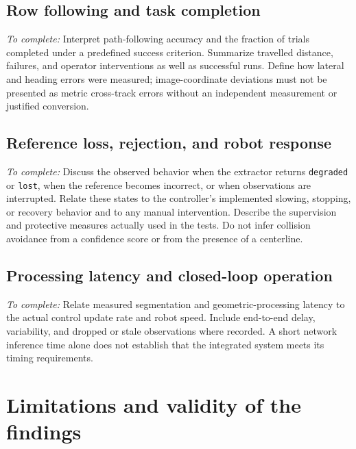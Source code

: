 \subsection{Row following and task completion}
\label{subsec:c6_field_tracking}

\emph{To complete:} Interpret path-following accuracy and the fraction
of trials completed under a predefined success criterion. Summarize
travelled distance, failures, and operator interventions as well as
successful runs. Define how lateral and heading errors were measured;
image-coordinate deviations must not be presented as metric cross-track
errors without an independent measurement or justified conversion.

\subsection{Reference loss, rejection, and robot response}
\label{subsec:c6_field_failures}

\emph{To complete:} Discuss the observed behavior when the extractor
returns \texttt{degraded} or \texttt{lost}, when the reference becomes
incorrect, or when observations are interrupted. Relate these states to
the controller's implemented slowing, stopping, or recovery behavior and
to any manual intervention. Describe the supervision and protective
measures actually used in the tests. Do not infer collision avoidance
from a confidence score or from the presence of a centerline.

\subsection{Processing latency and closed-loop operation}
\label{subsec:c6_field_timing}

\emph{To complete:} Relate measured segmentation and geometric-processing
latency to the actual control update rate and robot speed. Include
end-to-end delay, variability, and dropped or stale observations where
recorded. A short network inference time alone does not establish that
the integrated system meets its timing requirements.

\section{Limitations and validity of the findings}
\label{sec:c6_limitations}

